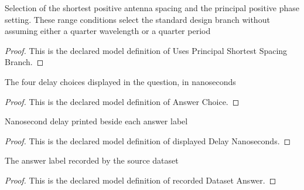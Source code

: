 \begin{definition}
  \label{def:physics:phyx-mini-0187:phyxminiproblems-problemphyxmini0187-usesprincipalshortestspacingbranch}
  Selection of the shortest positive antenna spacing and the principal positive phase setting. These range conditions select the standard design branch without assuming either a quarter wavelength or a quarter period
\end{definition}
\begin{proof}
  This is the declared model definition of Uses Principal Shortest Spacing Branch.
\end{proof}
\begin{definition}
  \label{def:physics:phyx-mini-0187:phyxminiproblems-problemphyxmini0187-answerchoice}
  The four delay choices displayed in the question, in nanoseconds
\end{definition}
\begin{proof}
  This is the declared model definition of Answer Choice.
\end{proof}
\begin{definition}
  \label{def:physics:phyx-mini-0187:phyxminiproblems-problemphyxmini0187-displayeddelaynanoseconds}
  Nanosecond delay printed beside each answer label
\end{definition}
\begin{proof}
  This is the declared model definition of displayed Delay Nanoseconds.
\end{proof}
\begin{definition}
  \label{def:physics:phyx-mini-0187:phyxminiproblems-problemphyxmini0187-recordeddatasetanswer}
  The answer label recorded by the source dataset
\end{definition}
\begin{proof}
  This is the declared model definition of recorded Dataset Answer.
\end{proof}
